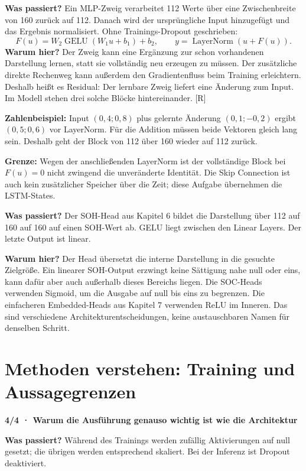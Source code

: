 \textbf{Was passiert?} Ein MLP-Zweig verarbeitet 112 Werte über eine Zwischenbreite von 160 zurück auf 112. Danach wird der ursprüngliche Input hinzugefügt und das Ergebnis normalisiert. Ohne Trainings-Dropout geschrieben:
\[
F(u)=W_2\operatorname{GELU}(W_1u+b_1)+b_2,
\qquad y=\operatorname{LayerNorm}(u+F(u)).
\]
\textbf{Warum hier?} Der Zweig kann eine Ergänzung zur schon vorhandenen Darstellung lernen, statt sie vollständig neu erzeugen zu müssen. Der zusätzliche direkte Rechenweg kann außerdem den Gradientenfluss beim Training erleichtern. Deshalb heißt es Residual: Der lernbare Zweig liefert eine Änderung zum Input. Im Modell stehen drei solche Blöcke hintereinander. [R]

\textbf{Zahlenbeispiel:} Input $(0{,}4;0{,}8)$ plus gelernte Änderung $(0{,}1;-0{,}2)$ ergibt $(0{,}5;0{,}6)$ vor LayerNorm. Für die Addition müssen beide Vektoren gleich lang sein. Deshalb geht der Block von 112 über 160 wieder auf 112 zurück.

\textbf{Grenze:} Wegen der anschließenden LayerNorm ist der vollständige Block bei $F(u)=0$ nicht zwingend die unveränderte Identität. Die Skip Connection ist auch kein zusätzlicher Speicher über die Zeit; diese Aufgabe übernehmen die LSTM-States.

\textbf{Was passiert?} Der SOH-Head aus Kapitel 6 bildet die Darstellung über 112 auf 160 auf 160 auf einen SOH-Wert ab. GELU liegt zwischen den Linear Layers. Der letzte Output ist linear.

\textbf{Warum hier?} Der Head übersetzt die interne Darstellung in die gesuchte Zielgröße. Ein linearer SOH-Output erzwingt keine Sättigung nahe null oder eins, kann dafür aber auch außerhalb dieses Bereichs liegen. Die SOC-Heads verwenden Sigmoid, um die Ausgabe auf null bis eins zu begrenzen. Die einfacheren Embedded-Heads aus Kapitel 7 verwenden ReLU im Inneren. Das sind verschiedene Architekturentscheidungen, keine austauschbaren Namen für denselben Schritt.

\clearpage
\section*{\color{accent}Methoden verstehen: Training und Aussagegrenzen}
\textbf{4/4 · Warum die Ausführung genauso wichtig ist wie die Architektur}

\textbf{Was passiert?} Während des Trainings werden zufällig Aktivierungen auf null gesetzt; die übrigen werden entsprechend skaliert. Bei der Inferenz ist Dropout deaktiviert.

